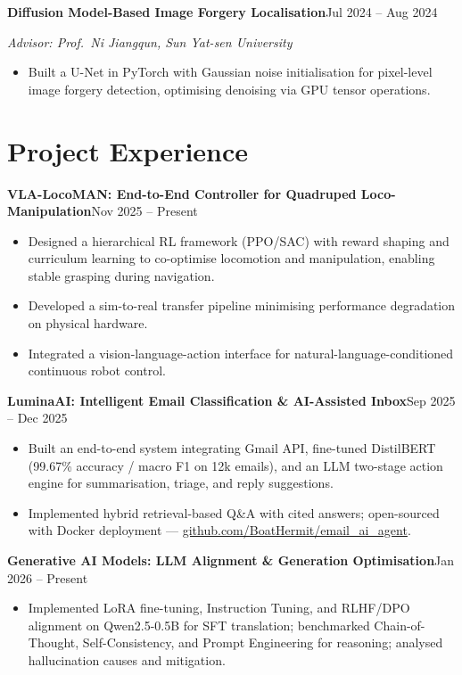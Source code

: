 \documentclass[a4paper,10pt]{article}
\newcommand{\entry}[2]{%
  \noindent\textbf{#1}\hfill#2\par%
}
\newcommand{\subline}[1]{%
  \noindent\textit{#1}\par%
}
\begin{document}
\vspace{3pt}
\entry{Diffusion Model-Based Image Forgery Localisation}{Jul 2024 -- Aug 2024}
\subline{Advisor: Prof.\ Ni Jiangqun, Sun Yat-sen University}
\begin{itemize}
  \item Built a U-Net in PyTorch with Gaussian noise initialisation for pixel-level image forgery detection, optimising denoising via GPU tensor operations.
\end{itemize}

\section*{Project Experience}

\entry{VLA-LocoMAN: End-to-End Controller for Quadruped Loco-Manipulation}{Nov 2025 -- Present}
\begin{itemize}
  \item Designed a hierarchical RL framework (PPO/SAC) with reward shaping and curriculum learning to co-optimise locomotion and manipulation, enabling stable grasping during navigation.
  \item Developed a sim-to-real transfer pipeline minimising performance degradation on physical hardware.
  \item Integrated a vision-language-action interface for natural-language-conditioned continuous robot control.
\end{itemize}

\vspace{3pt}
\entry{LuminaAI: Intelligent Email Classification \& AI-Assisted Inbox}{Sep 2025 -- Dec 2025}
\begin{itemize}
  \item Built an end-to-end system integrating Gmail API, fine-tuned DistilBERT (99.67\% accuracy / macro F1 on 12k emails), and an LLM two-stage action engine for summarisation, triage, and reply suggestions.
  \item Implemented hybrid retrieval-based Q\&A with cited answers; open-sourced with Docker deployment --- \href{https://github.com/BoatHermit/email_ai_agent}{github.com/BoatHermit/email\_ai\_agent}.
\end{itemize}

\vspace{3pt}
\entry{Generative AI Models: LLM Alignment \& Generation Optimisation}{Jan 2026 -- Present}
\begin{itemize}
  \item Implemented LoRA fine-tuning, Instruction Tuning, and RLHF/DPO alignment on Qwen2.5-0.5B for SFT translation; benchmarked Chain-of-Thought, Self-Consistency, and Prompt Engineering for reasoning; analysed hallucination causes and mitigation.
\end{itemize}
\end{document}
